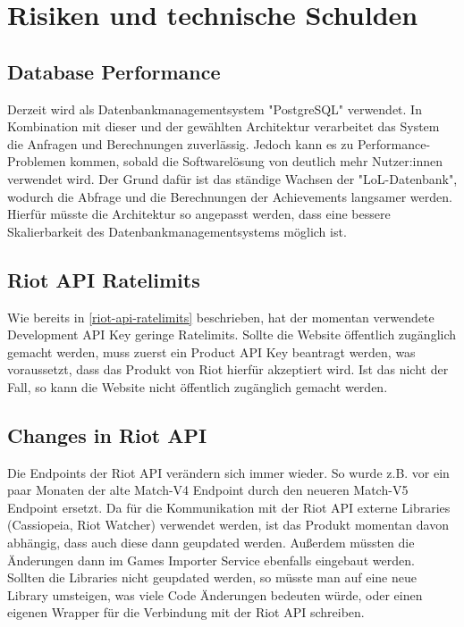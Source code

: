 \section{Risiken und technische Schulden}

\subsection{Database Performance}

Derzeit wird als Datenbankmanagementsystem "PostgreSQL" verwendet. In Kombination mit dieser und der gewählten Architektur verarbeitet das System die Anfragen und Berechnungen zuverlässig.
Jedoch kann es zu Performance-Problemen kommen, sobald die Softwarelösung von deutlich mehr Nutzer:innen verwendet wird. Der Grund dafür ist das ständige Wachsen der "LoL-Datenbank", wodurch die Abfrage und
die Berechnungen der Achievements langsamer werden. Hierfür müsste die Architektur so angepasst werden, dass eine bessere Skalierbarkeit des Datenbankmanagementsystems möglich ist.

\subsection{Riot API Ratelimits}
Wie bereits in \ref{riot-api-ratelimits} beschrieben, hat der momentan verwendete Development API Key geringe Ratelimits. Sollte die Website öffentlich zugänglich gemacht werden, muss zuerst ein Product API Key beantragt werden, was voraussetzt, dass das Produkt von Riot hierfür akzeptiert wird. Ist das nicht der Fall, so kann die Website nicht öffentlich zugänglich gemacht werden.

\subsection{Changes in Riot API}
Die Endpoints der Riot API verändern sich immer wieder. So wurde z.B. vor ein paar Monaten der alte Match-V4 Endpoint durch den neueren Match-V5 Endpoint ersetzt. Da für die Kommunikation mit der Riot API externe Libraries (Cassiopeia, Riot Watcher) verwendet werden, ist das Produkt momentan davon abhängig, dass auch diese dann geupdated werden.
Außerdem müssten die Änderungen dann im Games Importer Service ebenfalls eingebaut werden.\\ Sollten die Libraries nicht geupdated werden, so müsste man auf eine neue Library umsteigen, was viele Code Änderungen bedeuten würde, oder einen eigenen Wrapper für die Verbindung mit der Riot API schreiben.

